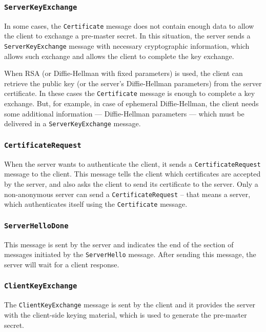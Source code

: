 \subsubsection{\texttt{ServerKeyExchange}}
    In some cases, the \texttt{Certificate} message does not contain enough data to
    allow the client to exchange a pre-master secret. In this situation, the
    server sends a \texttt{ServerKeyExchange} message with necessary cryptographic
    information, which allows such exchange and allows the client to complete
    the key exchange.

    When RSA (or Diffie-Hellman with fixed parameters) is used, the client can retrieve
    the public key (or the server's Diffie-Hellman parameters) from the server certificate.
    In these cases the \texttt{Certificate} message is enough to complete
    a key exchange. But, for example, in case of ephemeral Diffie-Hellman, the client
    needs some additional information --- Diffie-Hellman parameters --- which
    must be delivered in a \texttt{ServerKeyExchange} message.

\subsubsection{\texttt{CertificateRequest}}
    When the server wants to authenticate the client, it sends
    a \texttt{CertificateRequest} message to the client. This message tells
    the client which certificates are accepted by the server, and also asks
    the client to send its certificate to the server. Only a non-anonymous
    server can send a \texttt{CertificateRequest} -- that means a server, which
    authenticates itself using the \texttt{Certificate} message.

\subsubsection{\texttt{ServerHelloDone}}
    This message is sent by the server and indicates the end of the section
    of messages initiated by the \texttt{ServerHello} message. After sending
    this message, the server will wait for a client response.

\subsubsection{\texttt{ClientKeyExchange}}
    The \texttt{ClientKeyExchange} message is sent by the client and it provides
    the server with the client-side keying material, which is used to generate
    the pre-master secret.

